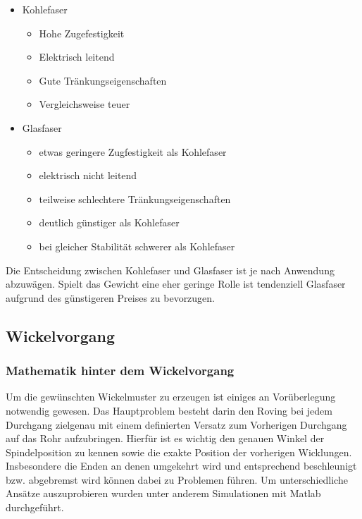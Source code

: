 \documentclass[12pt, a4paper, ngerman]{article}
\begin{document}
\begin{itemize}
	\item Kohlefaser
	\begin{itemize}
		\item Hohe Zugefestigkeit
		\item Elektrisch leitend
		\item Gute Tränkungseigenschaften
		\item Vergleichsweise teuer
	\end{itemize}
	\item Glasfaser
	\begin{itemize}
		\item etwas geringere Zugfestigkeit als Kohlefaser
		\item elektrisch nicht leitend
		\item teilweise schlechtere Tränkungseigenschaften
		\item deutlich günstiger als Kohlefaser
		\item bei gleicher Stabilität schwerer als Kohlefaser
	\end{itemize}
\end{itemize}

Die Entscheidung zwischen Kohlefaser und Glasfaser ist je nach Anwendung abzuwägen. Spielt das Gewicht eine eher geringe Rolle ist tendenziell Glasfaser aufgrund des günstigeren Preises zu bevorzugen.





\subsection{Wickelvorgang}

\subsubsection{Mathematik hinter dem Wickelvorgang}
Um die gewünschten Wickelmuster zu erzeugen ist einiges an Vorüberlegung notwendig gewesen. Das Hauptproblem besteht darin den Roving bei jedem Durchgang zielgenau mit einem definierten Versatz zum Vorherigen Durchgang auf das Rohr aufzubringen. Hierfür ist es wichtig den genauen Winkel der Spindelposition zu kennen sowie die exakte Position der vorherigen Wicklungen. Insbesondere die Enden an denen umgekehrt wird und entsprechend beschleunigt bzw. abgebremst wird können dabei zu Problemen führen. Um unterschiedliche Ansätze auszuprobieren wurden unter anderem Simulationen mit Matlab durchgeführt.
\end{document}
